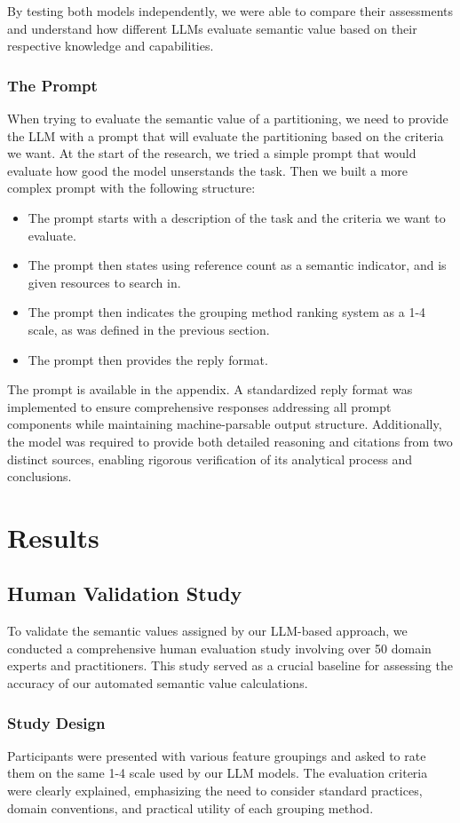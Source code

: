 \documentclass{article}
\begin{document}
By testing both models independently, we were able to compare their assessments and understand how different LLMs evaluate semantic value based on their respective knowledge and capabilities.

\subsubsection*{The Prompt}
When trying to evaluate the semantic value of a partitioning, we need to provide the LLM with a prompt that will evaluate the partitioning based on the criteria we want.
At the start of the research, we tried a simple prompt that would evaluate how good the model unserstands the task.
Then we built a more complex prompt with the following structure:
\begin{itemize}
    \item The prompt starts with a description of the task and the criteria we want to evaluate.
    \item The prompt then states using reference count as a semantic indicator, and is given resources to search in.
    \item The prompt then indicates the grouping method ranking system as a 1-4 scale, as was defined in the previous section.
    \item The prompt then provides the reply format.
\end{itemize}
The prompt is available in the appendix.
A standardized reply format was implemented to ensure comprehensive responses addressing all prompt components while maintaining machine-parsable output structure.
Additionally, the model was required to provide both detailed reasoning and citations from two distinct sources, enabling rigorous verification of its analytical process and conclusions.

\section*{Results}
\subsection*{Human Validation Study}
To validate the semantic values assigned by our LLM-based approach, we conducted a comprehensive human evaluation study involving over 50 domain experts and practitioners. This study served as a crucial baseline for assessing the accuracy of our automated semantic value calculations.

\subsubsection*{Study Design}
Participants were presented with various feature groupings and asked to rate them on the same 1-4 scale used by our LLM models. The evaluation criteria were clearly explained, emphasizing the need to consider standard practices, domain conventions, and practical utility of each grouping method.
\end{document}
